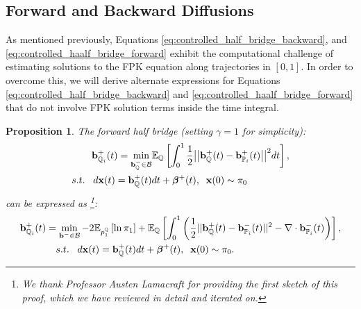 \documentclass[a4paper,12pt,twoside,openright]{report}
\newtheorem{proposition}{Proposition}
\theoremstyle{definition}
\begin{document}
\subsection{Forward and Backward Diffusions}

As mentioned previously, Equations \ref{eq:controlled_half_bridge_backward}, and \ref{eq:controlled_haalf_bridge_forward} exhibit the computational challenge of estimating solutions to the FPK equation along trajectories in $[0,1]$.  In order to overcome this, we will derive alternate expressions for Equations \ref{eq:controlled_half_bridge_backward} and \ref{eq:controlled_haalf_bridge_forward} that do not involve FPK solution terms inside the time integral.
\begin{proposition}\label{prop:halfforcontrol}
The forward half bridge (setting $\gamma=1$  for simplicity):
\begin{align*} 
   {\mathbf{b}}^{+}_{{\mathbb{Q}}_{i}}(t) =\min_{{\mathbf{b}}_{\mathbb{Q}}^{-} \in {\mathcal{B}} } & \mathbb{E}_{\mathbb{Q}}\left[\int_0^1 \frac{1}{2}\big|\big|{\mathbf{b}}_{\mathbb{Q}}^{+}(t) -{\mathbf{b}}^{+}_{{\mathbb{P}}_{i}}(t)\big|\big|^2 dt\right], \nonumber \\
    s.t.\;\;\; d{\mathbf{x}}(t) = {\mathbf{b}}_{\mathbb{Q}}^{+}(t) &dt +  {\bm{\beta}}^{+}(t), \;\; {\mathbf{x}}(0) \sim \pi_0
\end{align*}
can be expressed as \footnote{We thank Professor Austen Lamacraft for providing the first sketch of this proof, which we have reviewed in detail and iterated on.}:
\begin{align} \label{eq:div_control_forward}
   {\mathbf{b}}^{+}_{{\mathbb{Q}}_{i}}(t) =\min_{{\mathbf{b}}^{-} \in {\mathcal{B}} } -2\mathbb{E}_{p^{{\mathbb{Q}}}_1}\left[\operatorname{ln} \pi_1 \right] &+ \mathbb{E}_{{\mathbb{Q}}}\left[\int_0^1 \left(\frac{1}{2}||{\mathbf{b}}_{\mathbb{Q}}^{+}(t) -{\mathbf{b}}_{{\mathbb{P}}_{i}}^{-}(t)||^2 - \nabla\cdot{\mathbf{b}}^{-}_{{\mathbb{P}}_{i}}(t) \right)\right], \nonumber \\
    s.t.\;\;\; d{\mathbf{x}}(t) = {\mathbf{b}}_{\mathbb{Q}}^{+}(t) &dt + {\bm{\beta}}^{+}(t), \;\; {\mathbf{x}}(0) \sim \pi_0.
\end{align}
\end{proposition}
\end{document}
